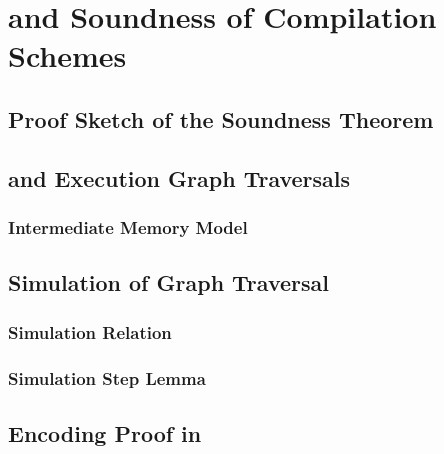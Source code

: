 \chapter{\Wkm and Soundness of Compilation Schemes}
\label{ch:weakestmo-imm}

\section{Proof Sketch of the Soundness Theorem}

\section{\IMM and Execution Graph Traversals}

\subsection*{Intermediate Memory Model}

\section{Simulation of \IMM Graph Traversal}

\subsection*{Simulation Relation}
\label{sec:simrel}

\subsection*{Simulation Step Lemma}
\label{sec:simstep}

\section{Encoding Proof in \coq}

